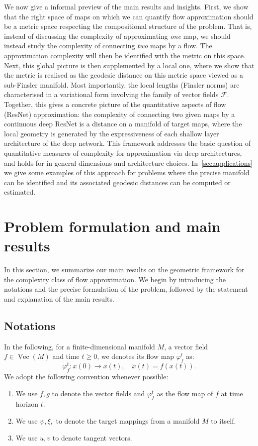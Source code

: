 \documentclass[12pt]{amsart}
\numberwithin{equation}{section}
\theoremstyle{remark}
\begin{document}
We now give a informal preview of the main results and insights.
First, we show that the right space of maps on which we can quantify flow approximation
should be a metric space respecting the compositional structure of the problem.
That is, instead of discussing the complexity of approximating \emph{one} map,
we should instead study the complexity of connecting \emph{two} maps by a flow.
The approximation complexity will then be identified with the metric on this space.
Next, this global picture is then supplemented by a local one,
where we show that the metric is realised as the geodesic distance
on this metric space viewed as a sub-Finsler manifold.
Most importantly, the local lengths (Finsler norms) are characterised
in a variational form involving the family of vector fields $\mathcal{F}$.
Together, this gives a concrete picture of the quantitative aspects of flow (ResNet) approximation:
the complexity of connecting two given maps by a continuous deep ResNet
is a distance on a manifold of target maps,
where the local geometry is generated by the expressiveness
of each shallow layer architecture of the deep network.
This framework addresses the basic question of quantitative measures of complexity
for approximation via deep architectures, and holds for in general dimensions
and architecture choices.
In~\cref{sec:applications} we give some examples of this approach for problems
where the precise manifold can be identified
and its associated geodesic distances can be computed or estimated.


% 

\section{Problem formulation and main results}
 In this section, we summarize our main results on the geometric framework for the complexity class of flow approximation. We begin by introducing the notations and the precise formulation of the problem, followed by the statement and explanation of the main results.
\subsection{Notations}

In the following, for a finite-dimensional manifold $M$, a vector field $f\in \operatorname{Vec}(M)$
and time $t\ge 0$, we denotes its flow map $\varphi_f^t$ as:
\begin{equation}
   \varphi_f^t: x(0)\to x(t), \quad \dot x(t) = f(x(t)).
\end{equation}
We adopt the following convention whenever possible:
\begin{enumerate}
\item We use $f, g$ to denote the vector fields and $\varphi_f^t$ as the flow map of $f$ at time horizon $t$.
\item We use $\psi, \xi,$ to denote the target mappings from a manifold $M$ to itself.
\item We use $u, v$ to denote tangent vectors.
\end{enumerate}
\end{document}
